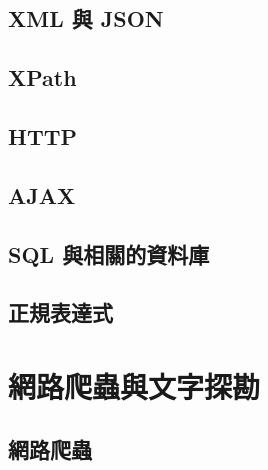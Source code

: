 \documentclass[
]{book}
\theoremstyle{definition}
\theoremstyle{remark}
\begin{document}
\hypertarget{xml-ux8207-json}{%
\chapter{XML 與 JSON}\label{xml-ux8207-json}}

\hypertarget{xpath}{%
\chapter{XPath}\label{xpath}}

\hypertarget{http}{%
\chapter{HTTP}\label{http}}

\hypertarget{ajax}{%
\chapter{AJAX}\label{ajax}}

\hypertarget{sql-ux8207ux76f8ux95dcux7684ux8cc7ux6599ux5eab}{%
\chapter{SQL 與相關的資料庫}\label{sql-ux8207ux76f8ux95dcux7684ux8cc7ux6599ux5eab}}

\hypertarget{ux6b63ux898fux8868ux9054ux5f0f}{%
\chapter{正規表達式}\label{ux6b63ux898fux8868ux9054ux5f0f}}

\hypertarget{part-ux7db2ux8defux722cux87f2ux8207ux6587ux5b57ux63a2ux52d8}{%
\part{網路爬蟲與文字探勘}\label{part-ux7db2ux8defux722cux87f2ux8207ux6587ux5b57ux63a2ux52d8}}

\hypertarget{ux7db2ux8defux722cux87f2}{%
\chapter{網路爬蟲}\label{ux7db2ux8defux722cux87f2}}

  
\end{document}
